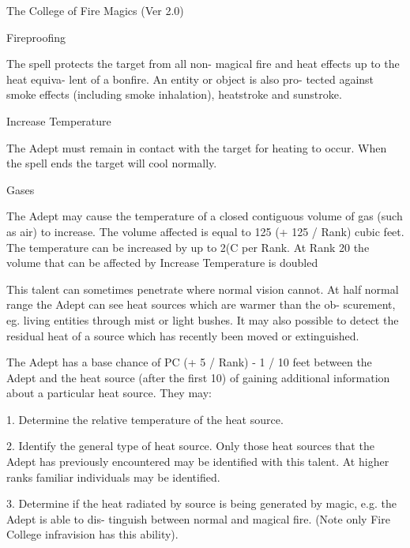 \begin{Chapter}{The College of Fire Magics (Ver 2.0)}
\begin{spell}[G-5]{Fireproofing }
\begin{effects}
 The  spell  protects  the  target from all  non-
magical fire and heat effects up to the heat equiva-
lent  of  a  bonfire.  An  entity  or  object  is  also  pro-
tected  against  smoke  effects  (including  smoke 
inhalation), heatstroke and sunstroke. 

\end{effects}
\end{spell}

\begin{spell}[G-6]{Increase Temperature }

\begin{effects}
The Adept must remain in contact with the 
target for heating to occur. When the spell ends the 
target will cool normally. 

Gases 

The  Adept  may  cause  the  temperature  of  a  closed 
contiguous volume of gas (such as air) to increase. 
The volume affected is equal to 125 (+ 125 / Rank) 
cubic feet. The temperature can be increased by up 
to  2(C  per  Rank.  At  Rank  20  the  volume  that  can 
be affected by Increase Temperature is doubled 

This  talent can  sometimes penetrate where  normal 
vision cannot. At half normal  range the Adept can 
see  heat  sources  which  are  warmer  than  the  ob-
scurement,  eg.  living  entities  through  mist  or  light 
bushes.  It  may  also  possible  to  detect  the  residual 
heat of a source which has recently been moved or 
extinguished. 

The Adept has a base chance of PC (+ 5 / Rank) - 1 
/  10  feet  between  the  Adept  and  the  heat  source 
(after the first 10) of gaining additional information 
about a particular heat source. They may:  

1.  Determine  the  relative  temperature  of  the  heat 
source. 

2.  Identify  the  general  type  of  heat  source.  Only 
those  heat  sources  that  the  Adept  has  previously 
encountered  may  be  identified  with  this  talent.  At 
higher ranks familiar individuals may be identified. 

3. Determine if the heat radiated by source is being 
generated  by  magic,  e.g.  the  Adept  is  able  to  dis-
tinguish  between  normal  and  magical  fire.  (Note 
only Fire College infravision has this ability). 


\end{effects}
\end{spell}
\end{Chapter}
